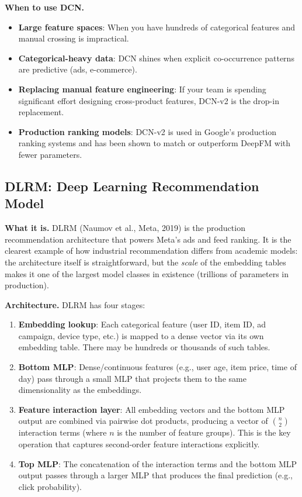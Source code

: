 \textbf{When to use DCN.}
\begin{itemize}
    \item \textbf{Large feature spaces}: When you have hundreds of categorical features and manual crossing is impractical.
    \item \textbf{Categorical-heavy data}: DCN shines when explicit co-occurrence patterns are predictive (ads, e-commerce).
    \item \textbf{Replacing manual feature engineering}: If your team is spending significant effort designing cross-product features, DCN-v2 is the drop-in replacement.
    \item \textbf{Production ranking models}: DCN-v2 is used in Google's production ranking systems and has been shown to match or outperform DeepFM with fewer parameters.
\end{itemize}

\subsection{DLRM: Deep Learning Recommendation Model}
\label{sec:dlrm}

\textbf{What it is.} DLRM (Naumov et al., Meta, 2019) is the production recommendation architecture that powers Meta's ads and feed ranking. It is the clearest example of how industrial recommendation differs from academic models: the architecture itself is straightforward, but the \textit{scale} of the embedding tables makes it one of the largest model classes in existence (trillions of parameters in production).

\textbf{Architecture.} DLRM has four stages:
\begin{enumerate}
    \item \textbf{Embedding lookup}: Each categorical feature (user ID, item ID, ad campaign, device type, etc.) is mapped to a dense vector via its own embedding table. There may be hundreds or thousands of such tables.
    \item \textbf{Bottom MLP}: Dense/continuous features (e.g., user age, item price, time of day) pass through a small MLP that projects them to the same dimensionality as the embeddings.
    \item \textbf{Feature interaction layer}: All embedding vectors and the bottom MLP output are combined via pairwise dot products, producing a vector of $\binom{n}{2}$ interaction terms (where $n$ is the number of feature groups). This is the key operation that captures second-order feature interactions explicitly.
    \item \textbf{Top MLP}: The concatenation of the interaction terms and the bottom MLP output passes through a larger MLP that produces the final prediction (e.g., click probability).
\end{enumerate}

